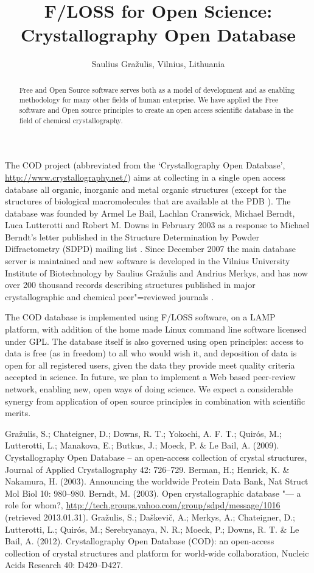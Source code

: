 \documentclass[10pt, a5paper]{article}
\begin{document}
\title{F/LOSS for Open Science: Crystallography Open Database}
\author{Saulius Gražulis, Vilnius, Lithuania}
\maketitle
\begin{abstract}
Free and Open Source software serves both as a model of development and as enabling methodology for many other fields of human enterprise. We have applied the Free software and Open source principles to create an open access scientific database in the field of chemical crystallography.
\end{abstract}
The COD project (abbreviated from the `Crystallography Open Database', \url{http://www.crystallography.net/}) aims at collecting in a single open access database all organic, inorganic and metal organic structures \cite{graz1} (except for the structures of biological macromolecules that are available at the PDB \cite{graz2}). The database was founded by Armel Le Bail, Lachlan Cranswick, Michael Berndt, Luca Lutterotti and Robert M. Downs in February 2003 as a response to Michael Berndt’s letter published in the Structure Determination by Powder Diffractometry (SDPD) mailing list \cite{graz3}. Since December 2007 the main database server is maintained and new software is developed in the Vilnius University Institute of Biotechnology by Saulius Gražulis and Andrius Merkys, and has now over 200 thousand records describing structures published in major crystallographic and chemical peer"=reviewed journals \cite{graz4}.

The COD database is implemented using F/LOSS software, on a LAMP platform, with addition of the home made Linux command line software licensed under GPL. The database itself is also governed using open principles: access to data is free (as in freedom) to all who would wish it, and deposition of data is open for all registered users, given the data they provide meet quality criteria accepted in science. In future, we plan to implement a Web based peer-review network, enabling new, open ways of doing science. We expect a considerable synergy from application of open source principles in combination with scientific merits.

\begin{thebibliography}{9}
 Gražulis, S.; Chateigner, D.; Downs, R. T.; Yokochi, A. F. T.; Quirós, M.; Lutterotti, L.; Manakova, E.; Butkus, J.; Moeck, P. \& Le Bail, A. (2009). Crystallography Open Database – an open-access collection of crystal structures, Journal of Applied Crystallography 42: 726--729.
 Berman, H.; Henrick, K. \& Nakamura, H. (2003). Announcing the worldwide Protein Data Bank, Nat Struct Mol Biol 10: 980--980.
 Berndt, M. (2003). Open crystallographic database "--- a role for whom?, \url{http://tech.groups.yahoo.com/group/sdpd/message/1016} (retrieved 2013.01.31).
 Gražulis, S.; Daškevič, A.; Merkys, A.; Chateigner, D.; Lutterotti, L.; Quirós, M.; Serebryanaya, N. R.; Moeck, P.; Downs, R. T. \& Le Bail, A. (2012). Crystallography Open Database (COD): an open-access collection of crystal structures and platform for world-wide collaboration, Nucleic Acids Research 40: D420--D427.
\end{thebibliography}
\end{document}
